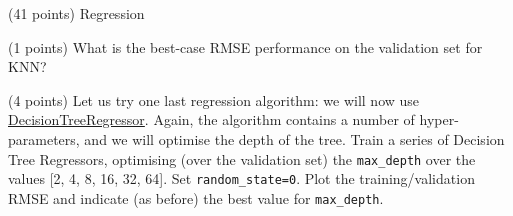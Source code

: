 \documentclass[12pt]{article}
\begin{document}
\begin{question}{\label{Q_LR_BA}(41 points) Regression}
\begin{subquestion}
\end{subquestion}

\begin{subquestion}{(1 points) What is the best-case RMSE performance on the validation set for KNN?}






\end{subquestion}

\begin{subquestion}{(4 points) Let us try one last regression algorithm: we will now use \href{https://scikit-learn.org/stable/modules/generated/sklearn.tree.DecisionTreeRegressor.html}{DecisionTreeRegressor}. Again, the algorithm contains a number of hyper-parameters, and we will optimise the depth of the tree. Train a series of Decision Tree Regressors, optimising (over the validation set) the \texttt{max\_depth} over the values [2, 4, 8, 16, 32, 64]. Set \texttt{random\_state=0}. Plot the training/validation RMSE and indicate (as before) the best value for \texttt{max\_depth}.}







\end{subquestion}
\end{question}
\end{document}
